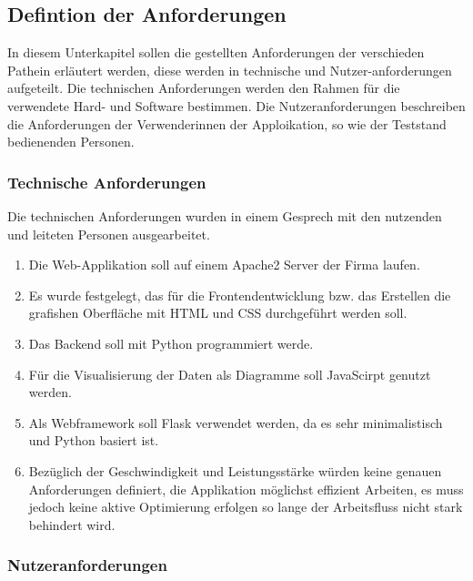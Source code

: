 \subsection{Defintion der Anforderungen}
\label{subsec:defintion-der-anforderungen}

In diesem Unterkapitel sollen die gestellten Anforderungen der verschieden Pathein erläutert werden, diese werden in
technische und Nutzer-anforderungen aufgeteilt.
Die technischen Anforderungen werden den Rahmen für die verwendete Hard- und Software bestimmen.
Die Nutzeranforderungen beschreiben die Anforderungen der Verwenderinnen der Apploikation, so wie der Teststand
bedienenden Personen.

\subsubsection{Technische Anforderungen}

Die technischen Anforderungen wurden in einem Gesprech mit den nutzenden und leiteten Personen ausgearbeitet.
\begin{enumerate}

    \item Die Web-Applikation soll auf einem Apache2 Server der Firma laufen.
    \item Es wurde festgelegt, das für die Frontendentwicklung bzw. das Erstellen
    die grafishen Oberfläche mit HTML und CSS durchgeführt werden soll.
    \item Das Backend soll mit Python programmiert werde.
    \item Für die Visualisierung der Daten als Diagramme soll JavaScirpt genutzt werden.
    \item Als Webframework soll Flask verwendet werden, da es sehr minimalistisch und Python basiert ist.
    \item Bezüglich der Geschwindigkeit und Leistungsstärke würden keine genauen Anforderungen definiert,
    die Applikation möglichst effizient Arbeiten, es muss jedoch keine aktive Optimierung erfolgen so
    lange der Arbeitsfluss nicht stark behindert wird.
\end{enumerate}

\subsubsection{Nutzeranforderungen}

